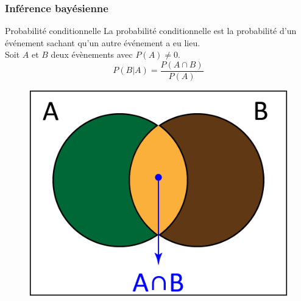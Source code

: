 \documentclass[aspectratio=169,professionalfonts, 12pt]{beamer}
\begin{document}
\begin{frame}
  \frametitle{Inférence bayésienne}
  \begin{minipage}{0.6\textwidth}
  \begin{block}{Probabilité conditionnelle}
    La probabilité conditionnelle est la probabilité d'un événement sachant qu'un autre événement a eu lieu.\\
    Soit \(\displaystyle A \)  et \(\displaystyle B \) deux évènements avec \(\displaystyle P(A) \neq 0 \).
    \begin{equation}
      P(B|A) = \frac{P(A\cap B)}{P(A)}
      \label{conditionnelle_probability}
    \end{equation}
  \end{block}
  \end{minipage}
  \begin{minipage}{2cm}
  
  \end{minipage}
  \begin{minipage}{0.3\textwidth}
    \begin{figure}[t]
    \begin{center}
      \includegraphics[width=\textwidth]{images/etat_art/conditional_b.png}
    \end{center}
    \end{figure} 
  \end{minipage}	
\end{frame}
\end{document}
